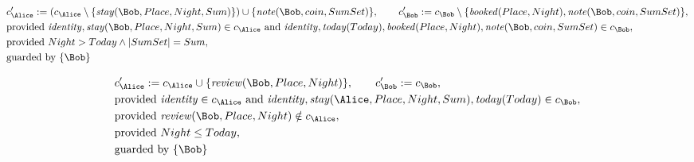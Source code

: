 \begin{align*}
&
c'_
{
\Alice
}
 := 
(c_
{
\Alice
}
 \setminus 
\{
\mathit{\detokenize{
stay
}}
(
\Bob
,
Place
,
Night
,
Sum
)
\}
) \cup 
\{
\mathit{\detokenize{
note
}}
(
\Bob
,
coin
,
SumSet
)
\}
, \qquad 
c'_
{
\Bob
}
 := 
c_
{
\Bob
}
 \setminus 
\{
\mathit{\detokenize{
booked
}}
(
Place
,
Night
)
,
\mathit{\detokenize{
note
}}
(
\Bob
,
coin
,
SumSet
)
\}
,\\
&
\text{provided } 
\mathit{\detokenize{
identity
}}
,
\mathit{\detokenize{
stay
}}
(
\Bob
,
Place
,
Night
,
Sum
)
 \in c_
{
\Alice
}
 \text{ and } 
\mathit{\detokenize{
identity
}}
,
\mathit{\detokenize{
today
}}
(
Today
)
,
\mathit{\detokenize{
booked
}}
(
Place
,
Night
)
,
\mathit{\detokenize{
note
}}
(
\Bob
,
coin
,
SumSet
)
 \in c_
{
\Bob
}
,\\
&
\text{provided } 
Night
>
Today
\land
|
SumSet
|
=
Sum
,\\
&
\text{guarded by } \{
\Bob
\}
\end{align*}

\begin{align*}
&
c'_
{
\Alice
}
 := 
c_
{
\Alice
}
 \cup 
\{
\mathit{\detokenize{
review
}}
(
\Bob
,
Place
,
Night
)
\}
, \qquad 
c'_
{
\Bob
}
 := 
c_
{
\Bob
}
,\\
&
\text{provided } 
\mathit{\detokenize{
identity
}}
 \in c_
{
\Alice
}
 \text{ and } 
\mathit{\detokenize{
identity
}}
,
\mathit{\detokenize{
stay
}}
(
\Alice
,
Place
,
Night
,
Sum
)
,
\mathit{\detokenize{
today
}}
(
Today
)
 \in c_
{
\Bob
}
,\\
&
\text{provided } 
\mathit{\detokenize{
review
}}
(
\Bob
,
Place
,
Night
)
 \notin c_
{
\Alice
}
,\\
&
\text{provided } 
Night
\le
Today
,\\
&
\text{guarded by } \{
\Bob
\}
\end{align*}
